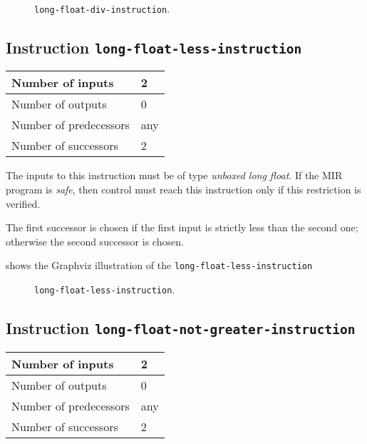 \begin{figure}
\begin{center}
\end{center}
\caption{\label{fig-long-float-div-instruction}
\texttt{long-float-div-instruction}.}
\end{figure}

\subsection{Instruction \texttt{long-float-less-instruction}}
\label{mir-instruction-long-float-less}

\begin{tabular}{|l|l|}
\hline
Number of inputs & 2\\
\hline
Number of outputs & 0\\
\hline
Number of predecessors & any\\
\hline
Number of successors & 2\\
\hline
\end{tabular}

The inputs to this instruction must be of type \emph{unboxed long
  float}.  If the MIR program is \emph{safe}, then control must reach
this instruction only if this restriction is verified.

The first successor is chosen if the first input is strictly less than
the second one; otherwise the second successor is chosen. 

 shows the Graphviz illustration of the
\texttt{long-float-less-instruction}

\begin{figure}
\begin{center}
\end{center}
\caption{\label{fig-long-float-less-instruction}
\texttt{long-float-less-instruction}.}
\end{figure}

\subsection{Instruction \texttt{long-float-not-greater-instruction}}
\label{mir-instruction-long-float-not-greater}

\begin{tabular}{|l|l|}
\hline
Number of inputs & 2\\
\hline
Number of outputs & 0\\
\hline
Number of predecessors & any\\
\hline
Number of successors & 2\\
\hline
\end{tabular}


